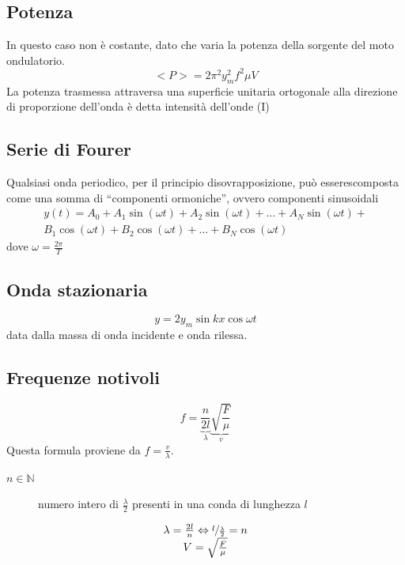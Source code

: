 \documentclass{book}
\begin{document}
\subsection{Potenza}
\label{sec:potenza}

In questo caso {\color{red}non è costante}, dato che varia la potenza della sorgente del moto ondulatorio.
\begin{equation}
  \label{eq:potenza}
  <P>= 2\pi^2y_m^2f^2\mu V
\end{equation}
La potenza trasmessa attraversa una superficie unitaria ortogonale alla direzione di proporzione dell'onda è detta {\color{red}intensità dell'onde (I)}

\subsection{Serie di Fourer}
\label{sec:fourer}

Qualsiasi onda periodico, per il principio disovrapposizione, può esserescomposta come una somma di ``componenti ormoniche'', ovvero componenti sinusoidali
\begin{equation}
  \label{eq:fourer}
  \begin{matrix}
    y(t)=A_0+A_1\sin(\omega t)+A_2\sin(\omega t)+\dots+A_N\sin(\omega t) +\\
    B_1\cos(\omega t)+B_2 \cos(\omega t) +\dots + B_N\cos (\omega t)
  \end{matrix}
\end{equation}
dove $\omega=\frac{2\pi}{T}$

\subsection{Onda stazionaria}
\label{sec:ondaStazionaria}

\begin{equation}
  \label{eq:ondaStazionaria}
  y=2y_m\sin kx \cos \omega t
\end{equation}
data dalla massa di onda incidente e onda rilessa.

\subsection{Frequenze notivoli}
\label{sec:freqnot}

\begin{equation}
  \label{eq:freqnot}
  f=\underbrace{\frac{n}{2l}}_\lambda\underbrace{\sqrt{\frac{F}{\mu}}}_{v}
\end{equation}
Questa formula proviene da $f=\frac{v}{\lambda}$.
\begin{description}
\item[$n \in \mathds{N}$] numero intero di $\frac{\lambda}{2}$ presenti in una conda di lunghezza $l$
\end{description}
\begin{equation}
  \label{eq:freqnot2}
  \begin{matrix}
    \lambda = \frac{2l}{n} \Leftrightarrow \sfrac{l}{\frac{\lambda}{2}}=n\\
    V=\sqrt{\frac{F}{\mu}}
  \end{matrix}
\end{equation}
\end{document}
